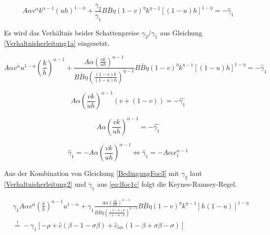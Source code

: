 		\begin{equation*}
		 A \alpha v^{\alpha}k^{\alpha -1} (uh)^{1- \alpha} + \frac{\gamma_{2}}{\gamma_{1}}B\bar{B}\eta (1- v)^{\eta} k^{\eta -1} \left [(1-u)h \right ]^{1- \eta}= - \hat{\gamma}_{1}
		\end{equation*}


Es wird das Verhältnis beider Schattenpreise $\gamma_2/\gamma_1$ aus Gleichung \eqref{Verhaltnisherleitung1a} eingesetzt.


	\begin{equation*}
		 A \alpha v^{\alpha} {u}^{1- \alpha} \left(\frac{k}{h}\right)^{\alpha -1}+ \frac{A\alpha \left(\frac{vk}{uh}\right)^{\alpha-1}}{B\bar{B}\eta\left(\frac{(1-v)k}{(1-u)h}\right)^{\eta-1}}B\bar{B}\eta (1- v)^{\eta} k^{\eta -1} \left [(1-u)h \right ]^{1- \eta}= - \hat{\gamma}_{1}
	\end{equation*}


	\begin{equation*}
		 A \alpha \left(\frac{vk}{uh}\right)^{\alpha -1}(v+ (1- v))= -\hat{\gamma_{1}}
	\end{equation*}


	\begin{equation*}
		 A \alpha \left(\frac{vk}{uh}\right)^{\alpha -1} = - \hat{\gamma_{1}}
	\end{equation*}


	\begin{equation}
		\hat{\gamma}_1=-A\alpha \left(\frac{vk}{uh}\right)^{\alpha-1}\Longleftrightarrow \hat{\gamma}_1=-A\alpha x_1^{\alpha-1}\label{foc3}
	\end{equation}


Aus der Kombination von Gleichung \eqref{BedingungFoc3} mit $\gamma_2$ laut \eqref{Verhaltnisherleitung2} und $\dot{\gamma}_1$ aus \eqref{eq:lfoc1c} folgt die Keynes-Ramsey-Regel.


	\begin{equation}
		\begin{split}
			&\gamma_{1}A \alpha v^{\alpha} \left(\frac{k}{h}\right)^{\alpha -1} u^{1- \alpha}+\gamma_1\frac{A\alpha \left(\frac{vk}{uh}\right)^{\alpha-1}}{B\bar{B}\eta\left(\frac{(1-v)k}{(1-u)h}\right)^{\eta-1}}{B\bar{B}\eta (1- v)^{\eta} k^{\eta-1} \left [ h(1-u) \right ]^{1- \eta}}\\
			&\overset{!}{=} - \gamma_{1}\left [ - \rho + \hat{c} (\beta -1 - \sigma \beta)+\hat{c}_{im}(1- \beta + \sigma \beta - \sigma) \right ]
		\end{split}
	\end{equation}


